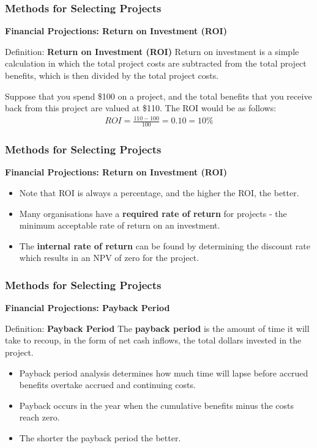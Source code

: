 \documentclass[aspectratio=169]{beamer}
\begin{document}
\begin{frame}
\frametitle{Methods for Selecting Projects}
\textbf{Financial Projections: Return on Investment (ROI)}\\
\vspace{0.5cm}
\begin{block}{Definition: \textbf{Return on Investment (ROI)}}
Return on investment is a simple calculation in which the total project costs are subtracted from the total project benefits, which is then divided by the total project costs.
\end{block}
\vspace{0.5cm}
\begin{example}
Suppose that you spend \$100 on a project, and the total benefits that you receive back from this project are valued at \$110. The ROI would be as follows:
\begin{align*}
ROI = \frac{110 - 100}{100} = 0.10 = 10\%
\end{align*}
\end{example}
\end{frame}
\begin{frame}
\frametitle{Methods for Selecting Projects}
\textbf{Financial Projections: Return on Investment (ROI)}\\
\vspace{0.5cm}
\begin{itemize}
\item Note that ROI is always a percentage, and the higher the ROI, the better.
\item Many organisations have a \textbf{required rate of return} for projects - the minimum acceptable rate of return on an investment.
\item The \textbf{internal rate of return} can be found by determining the discount rate which results in an NPV of zero for the project.
\end{itemize}
\end{frame}
\begin{frame}
\frametitle{Methods for Selecting Projects}
\textbf{Financial Projections: Payback Period}\\
\vspace{0.5cm}
\begin{block}{Definition: \textbf{Payback Period}}
The \textbf{payback period} is the amount of time it will take to recoup, in the form of net cash inflows, the total dollars invested in the project.
\end{block}
\vspace{0.5cm}
\begin{itemize}
\item Payback period analysis determines how much time will lapse before accrued benefits overtake accrued and continuing costs.
\item Payback occurs in the year when the cumulative benefits minus the costs reach zero.
\item The shorter the payback period the better.
\end{itemize}
\end{frame}
\end{document}
